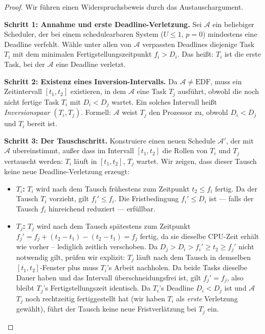 ﻿\documentclass[a4paper,12pt]{article}
\theoremstyle{definition}
\begin{document}
	\begin{proof}
		Wir führen einen Widerspruchsbeweis durch das Austauschargument.

		\medskip
		\textbf{Schritt 1: Annahme und erste Deadline-Verletzung.}
		Sei $\mathcal{A}$ ein beliebiger Scheduler, der bei einem schedulearbaren
		System ($U \le 1$, $p=0$) mindestens eine Deadline verfehlt. Wähle unter
		allen von $\mathcal{A}$ verpassten Deadlines diejenige Task $T_i$ mit dem
		minimalen Fertigstellungszeitpunkt $f_i > D_i$. Das hei\ss{}t: $T_i$ ist
		die erste Task, bei der $\mathcal{A}$ eine Deadline verletzt.

		\medskip
		\textbf{Schritt 2: Existenz eines Inversion-Intervalls.}
		Da $\mathcal{A} \neq \text{EDF}$, muss ein Zeitintervall $[t_1, t_2]$
		existieren, in dem $\mathcal{A}$ eine Task $T_j$ ausführt, obwohl
		die noch nicht fertige Task $T_i$ mit $D_i < D_j$ wartet. Ein solches
		Intervall hei\ss{}t \emph{Inversionspaar} $(T_i, T_j)$.
		Formell: $\mathcal{A}$ weist $T_j$ den Prozessor zu, obwohl
		$D_i < D_j$ und $T_i$ bereit ist.

		\medskip
		\textbf{Schritt 3: Der Tauschschritt.}
		Konstruiere einen neuen Schedule $\mathcal{A}'$, der mit $\mathcal{A}$
		ubereinstimmt, au\ss{}er dass im Intervall $[t_1, t_2]$ die Rollen von
		$T_i$ und $T_j$ vertauscht werden: $T_i$ läuft in $[t_1, t_2]$,
		$T_j$ wartet. Wir zeigen, dass dieser Tausch keine neue Deadline-Verletzung
		erzeugt:
		\begin{itemize}
			\item \textbf{$T_i$:} $T_i$ wird nach dem Tausch frühestens zum
			      Zeitpunkt $t_2 \le f_i$ fertig. Da der Tausch $T_i$ vorzieht,
			      gilt $f_i' \le f_i$. Die Fristbedingung $f_i' \le D_i$ ist
			      --- falls der Tausch $f_i$ hinreichend reduziert --- erfüllbar.
			\item \textbf{$T_j$:} $T_j$ wird nach dem Tausch spätestens zum
			      Zeitpunkt $f_j' = f_j + (t_2 - t_1) - (t_2 - t_1) = f_j$
			      fertig, da sie dieselbe CPU-Zeit erhält wie vorher -- lediglich
			      zeitlich verschoben. Da $D_j > D_i > f_i' \ge t_2 \ge f_j'$
			      nicht notwendig gilt, prüfen wir explizit: $T_j$ läuft nach
			      dem Tausch in demselben $[t_1, t_2]$-Fenster plus muss
			      $T_i$'s Arbeit nachholen. Da beide Tasks dieselbe Dauer haben
			      und das Intervall überschneidungsfrei ist, gilt
			      $f_j' = f_j$, also bleibt $T_j$'s Fertigstellungszeit
			      identisch. Da $T_i$'s Deadline $D_i < D_j$ ist und
			      $\mathcal{A}$ $T_j$ noch rechtzeitig fertiggestellt hat
			      (wir haben $T_i$ als \emph{erste} Verletzung gewählt),
			      führt der Tausch keine neue Fristverlätzung bei $T_j$ ein.
		\end{itemize}


\end{proof}
\end{document}
